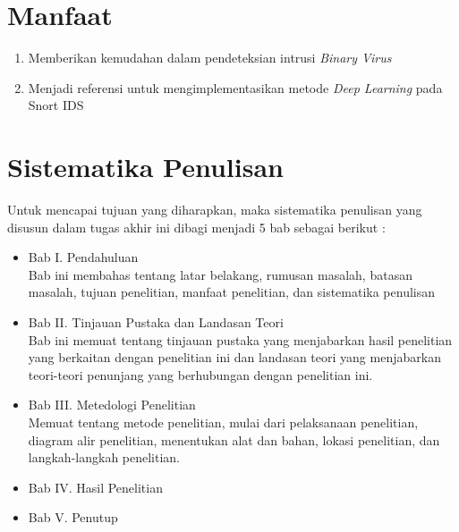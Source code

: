 \documentclass[./skripsi.tex]{subfiles}
\begin{document}
\section{Manfaat}
\begin{enumerate}
    \item Memberikan kemudahan dalam pendeteksian intrusi \textit{Binary Virus}
    \item Menjadi referensi untuk mengimplementasikan metode \textit{Deep Learning} pada Snort IDS
\end{enumerate}
\section{Sistematika Penulisan}
Untuk mencapai tujuan yang diharapkan, maka sistematika penulisan yang disusun dalam tugas akhir ini dibagi menjadi 5 bab sebagai berikut :
\begin{itemize}
    \item Bab I. Pendahuluan \\ Bab ini membahas tentang latar belakang, rumusan masalah, batasan masalah, tujuan penelitian, manfaat penelitian, dan sistematika penulisan
    \item Bab II. Tinjauan Pustaka dan Landasan Teori \\ Bab ini memuat tentang tinjauan pustaka yang menjabarkan hasil penelitian yang berkaitan dengan penelitian ini dan landasan teori yang menjabarkan teori-teori penunjang yang berhubungan dengan penelitian ini.
    \item Bab III. Metedologi Penelitian \\ Memuat tentang metode penelitian, mulai dari pelaksanaan penelitian, diagram alir penelitian, menentukan alat dan bahan, lokasi penelitian, dan langkah-langkah penelitian.
    \item Bab IV. Hasil Penelitian
    \item Bab V. Penutup
\end{itemize}
\end{document}
